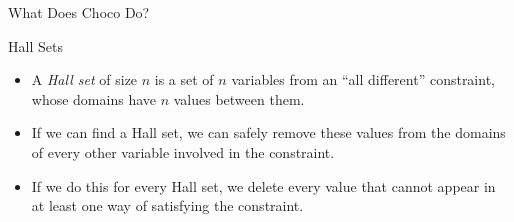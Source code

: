 \documentclass{beamer}
\begin{document}
\begin{frame}[fragile]{What Does Choco Do?}
     {
        
    }

     {
        

        \begin{center}\end{center}
    }

     {
        
    }

     {
        
    }
\end{frame}

\begin{frame}{Hall Sets}
    \begin{itemize}
        \item A \emph{Hall set} of size $n$ is a set of $n$ variables from an ``all different''
            constraint, whose domains have $n$ values between them.

        \item If we can find a Hall set, we can safely remove these values from the domains of every
            other variable involved in the constraint.

        \item If we do this for every Hall set, we delete every value that cannot appear in at least
            one way of satisfying the constraint.
    \end{itemize}
\end{frame}
\end{document}
